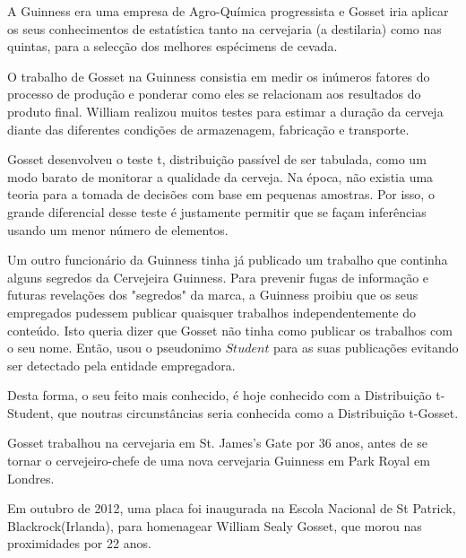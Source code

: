 

A Guinness era uma empresa de Agro-Química progressista e Gosset iria aplicar os seus conhecimentos de estatística tanto na cervejaria (a destilaria) como nas quintas, para a selecção dos melhores espécimens de cevada.\vskip0.3cm

O trabalho de Gosset na Guinness consistia em medir os inúmeros fatores do processo de produção e ponderar como eles se relacionam aos resultados do produto final. William realizou muitos testes para estimar a duração da cerveja diante das diferentes condições de armazenagem, fabricação e transporte.\vskip0.3cm


Gosset desenvolveu o teste t, distribuição passível de ser tabulada, como um modo barato de monitorar a qualidade da cerveja. Na época, não existia uma teoria para a tomada de decisões com base em pequenas amostras. Por isso, o grande diferencial desse teste é justamente permitir que se façam inferências usando um menor número de elementos. \vskip0.3cm

Um outro funcionário da Guinness tinha já publicado um trabalho que continha alguns segredos da Cervejeira Guinness. Para prevenir fugas de informação e futuras revelações dos "segredos" da marca, a Guinness proibiu que os seus empregados pudessem publicar quaisquer trabalhos independentemente do conteúdo. Isto queria dizer que Gosset não tinha como publicar os trabalhos com o seu nome. Então, usou o pseudonimo $Student$ para as suas publicações evitando ser detectado pela entidade empregadora. \vskip0.3cm

\newpage
Desta forma, o seu feito mais conhecido, é hoje conhecido com a Distribuição t-Student, que noutras circunstâncias seria conhecida como a Distribuição t-Gosset.\vskip0.3cm


Gosset trabalhou na cervejaria em St. James's Gate por 36 anos, antes de se tornar o cervejeiro-chefe de uma nova cervejaria Guinness em Park Royal em Londres.\vskip0.3cm

Em outubro de 2012, uma placa foi inaugurada na Escola Nacional de St Patrick, Blackrock(Irlanda), para homenagear William Sealy Gosset, que morou nas proximidades por 22 anos. \vskip0.3cm

